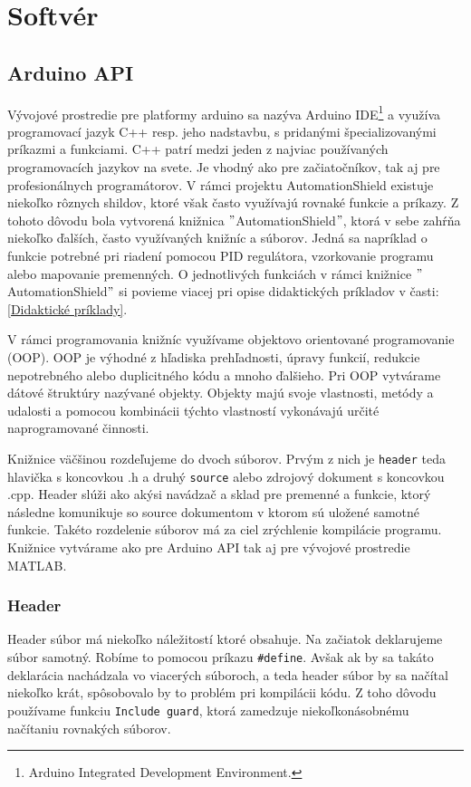 \section{Softvér}
\subsection{Arduino API}

Vývojové prostredie pre platformy arduino sa nazýva Arduino IDE\footnote[5]{Arduino Integrated Development Environment.} a využíva programovací jazyk C++ resp. jeho nadstavbu, s pridanými špecializovanými príkazmi a funkciami. C++ patrí medzi jeden z najviac používaných programovacích jazykov na svete. Je vhodný ako pre začiatočníkov, tak aj pre profesionálnych programátorov. V rámci projektu AutomationShield existuje niekoľko rôznych shildov, ktoré však často využívajú rovnaké funkcie a príkazy. Z tohoto dôvodu bola vytvorená knižnica $"$AutomationShield$"$, ktorá v sebe zahŕňa niekoľko ďalších, často využívaných knižníc a súborov. Jedná sa napríklad o funkcie potrebné pri riadení pomocou PID regulátora, vzorkovanie programu alebo mapovanie premenných. O jednotlivých funkciách v rámci knižnice $"$AutomationShield$"$ si povieme viacej pri opise didaktických príkladov v časti:\ref{Didaktické príklady}.

V rámci programovania knižníc využívame objektovo orientované programovanie \newline (OOP)\cite{oop}. OOP je výhodné z hľadiska prehľadnosti, úpravy funkcií, redukcie nepotrebného alebo duplicitného kódu a mnoho ďalšieho. Pri OOP vytvárame dátové štruktúry nazývané objekty. Objekty majú svoje vlastnosti, metódy a udalosti a pomocou kombinácii týchto vlastností vykonávajú určité naprogramované činnosti. 

Knižnice väčšinou rozdeľujeme do dvoch súborov. Prvým z nich je \verb|header| teda hlavička s koncovkou .h a druhý \verb|source| alebo zdrojový dokument s koncovkou .cpp. Header slúži ako akýsi navádzač a sklad pre premenné a funkcie, ktorý následne komunikuje so source dokumentom v ktorom sú uložené samotné funkcie.
Takéto rozdelenie súborov má za ciel zrýchlenie kompilácie programu. Knižnice vytvárame ako pre Arduino API tak aj pre vývojové prostredie MATLAB. 


\subsubsection{Header}

Header súbor má niekoľko náležitostí ktoré obsahuje. Na začiatok deklarujeme súbor samotný. Robíme to pomocou príkazu \verb|#define|. Avšak ak by sa takáto deklarácia nachádzala vo viacerých súboroch, a teda header súbor by sa načítal niekoľko krát, spôsobovalo by to problém pri kompilácii kódu. Z toho dôvodu používame funkciu \verb|Include guard|, ktorá zamedzuje niekoľkonásobnému načítaniu rovnakých súborov. 

